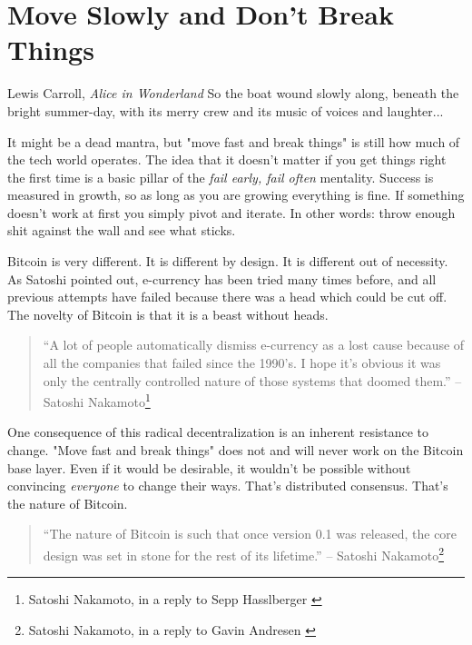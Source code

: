 \chapter{Move Slowly and Don't Break Things}
\label{les:18}

\begin{chapquote}{Lewis Carroll, \textit{Alice in Wonderland}}
So the boat wound slowly along, beneath the bright summer-day, with its merry crew and its music of voices and laughter...
\end{chapquote}

It might be a dead mantra, but "move fast and break things" is still how
much of the tech world operates. The idea that it doesn't matter if you
get things right the first time is a basic pillar of the \textit{fail early,
fail often} mentality. Success is measured in growth, so as long as you
are growing everything is fine. If something doesn't work at first you
simply pivot and iterate. In other words: throw enough shit against the
wall and see what sticks.

Bitcoin is very different. It is different by design. It is different
out of necessity. As Satoshi pointed out, e-currency has been tried
many times before, and all previous attempts have failed because there
was a head which could be cut off. The novelty of Bitcoin is that it is
a beast without heads.

\begin{quotation}
\enquote{A lot of people automatically dismiss e-currency as a lost cause
because of all the companies that failed since the 1990's. I hope it's
obvious it was only the centrally controlled nature of those systems
that doomed them.}
\flushright -- Satoshi Nakamoto\footnote{Satoshi Nakamoto, in a reply to Sepp Hasslberger \cite{satoshi-centralized-nature}}
\end{quotation}

One consequence of this radical decentralization is an inherent
resistance to change. "Move fast and break things" does not and will
never work on the Bitcoin base layer. Even if it would be desirable, it
wouldn't be possible without convincing \textit{everyone} to change their ways.
That's distributed consensus. That's the nature of Bitcoin.

\begin{quotation}
\enquote{The nature of Bitcoin is such that once version 0.1 was released, the
core design was set in stone for the rest of its lifetime.}
\flushright -- Satoshi Nakamoto\footnote{Satoshi Nakamoto, in a reply to Gavin Andresen \cite{satoshi-centralized-nature}}
\end{quotation}

